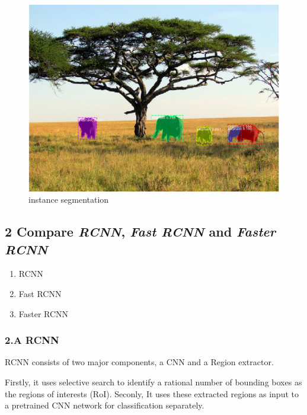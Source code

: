 \documentclass[11pt]{article}
\makeatletter
\def\maxwidth{\ifdim\Gin@nat@width>\linewidth\linewidth
    \else\Gin@nat@width\fi}
\let\Oldincludegraphics\includegraphics
\renewcommand{\includegraphics}[1]{\Oldincludegraphics[width=.8\maxwidth]{#1}}
\providecommand{\tightlist}{%
      \setlength{\itemsep}{0pt}\setlength{\parskip}{0pt}}
\makeatother
\begin{document}
\begin{figure}
\centering
\includegraphics{wiki/instancesegmentation.png}
\caption{instance segmentation}
\end{figure}

    \hypertarget{compare-rcnn-fast-rcnn-and-faster-rcnn}{%
\subsection{\texorpdfstring{2 Compare \emph{RCNN}, \emph{Fast RCNN} and
\emph{Faster
RCNN}}{2 Compare RCNN, Fast RCNN and Faster RCNN}}\label{compare-rcnn-fast-rcnn-and-faster-rcnn}}

\begin{enumerate}
\def\labelenumi{\arabic{enumi}.}
\tightlist
\item
  RCNN
\item
  Fast RCNN
\item
  Faster RCNN
\end{enumerate}

    \hypertarget{a-rcnn}{%
\subsubsection{2.A RCNN}\label{a-rcnn}}

RCNN consists of two major components, a CNN and a Region extractor.

Firstly, it uses selective search to identify a rational number of
bounding boxes as the regions of interests (RoI). Seconly, It uses these
extracted regions as input to a pretrained CNN network for
classification separately.
\end{document}
